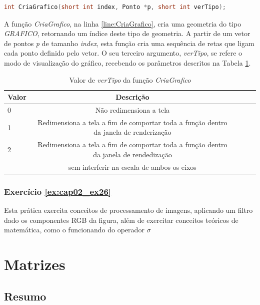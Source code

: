 \begin{lstlisting}[label={func:CriaGrafico},language=C++]
int CriaGrafico(short int index, Ponto *p, short int verTipo);
\end{lstlisting}
A função \emph{CriaGrafico}, na linha \ref{line:CriaGrafico}, cria uma geometria do tipo \emph{GRAFICO}, retornando um índice deste tipo de geometria. A partir de um vetor de pontos \emph{p} de tamanho \emph{index}, esta função cria uma sequência de retas que ligam cada ponto definido pelo vetor. O seu terceiro argumento, \emph{verTipo}, se refere o modo de visualização do gráfico, recebendo os parâmetros descritos na Tabela \ref{tab:CriaGrafico}.

\begin{table}[H]
  \caption{Valor de \emph{verTipo} da função \emph{CriaGrafico}}
  \centering
    \begin{tabular}{lcccc}
    \hline
    Valor&\bf Descrição \\
    \hline
    0 & Não redimensiona a tela  \\
    1  & Redimensiona a tela a fim de comportar toda a função dentro da janela de renderização \\
    2  & Redimensiona a tela a fim de comportar toda a função dentro da janela de rendedização  \\ & sem interferir na escala de ambos os eixos \\
    \hline
  \end{tabular}
  \label{tab:CriaGrafico}
\end{table}

\subsection*{Exercício \ref{ex:cap02_ex26}}

Esta prática exercita conceitos de processamento de imagens, aplicando um filtro dado os componentes RGB da figura, além de exercitar conceitos teóricos de matemática, como o funcionando do operador $\sigma$



\chapter[Matrizes]
{Matrizes}



\section*{Resumo}

